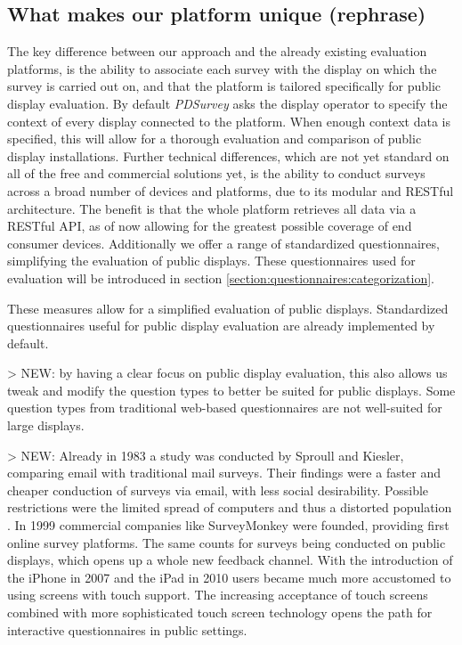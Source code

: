 	\subsection{What makes our platform unique (rephrase)}
	The key difference between our approach and the already existing evaluation platforms, is the ability to associate each survey with the display on which the survey is carried out on, and that the platform is tailored specifically for public display evaluation.
	By default \textit{PDSurvey} asks the display operator to specify the context of every display connected to the platform. When enough context data is specified, this will allow for a thorough evaluation and comparison of public display installations.
	Further technical differences, which are not yet standard on all of the free and commercial solutions yet, is the ability to conduct surveys across a broad number of devices and platforms, due to its modular and RESTful architecture. The benefit is that the whole platform retrieves all data via a RESTful API, as of now allowing for the greatest possible coverage of end consumer devices. Additionally we offer a range of standardized questionnaires, simplifying the evaluation of public displays. These questionnaires used for evaluation will be introduced in section \ref{section:questionnaires:categorization}.

	These measures allow for a simplified evaluation of public displays. Standardized questionnaires useful for public display evaluation are already implemented by default.


	> NEW: by having a clear focus on public display evaluation, this also allows us tweak and modify the question types to better be suited for public displays. Some question types from traditional web-based questionnaires are not well-suited for large displays.



	> NEW: %
	Already in 1983 a study was conducted by Sproull and Kiesler, comparing email with traditional mail surveys. Their findings were a faster and cheaper conduction of surveys via email, with less social desirability. Possible restrictions were the limited spread of computers and thus a distorted population \cite{sproull1986reducing}. In 1999 commercial companies like SurveyMonkey were founded, providing first online survey platforms. The same counts for surveys being conducted on public displays, which opens up a whole new feedback channel. With the introduction of the iPhone in 2007 and the iPad in 2010 users became much more accustomed to using screens with touch support. The increasing acceptance of touch screens combined with more sophisticated touch screen technology opens the path for interactive questionnaires in public settings. 



